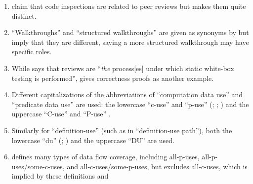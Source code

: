 \begin{enumerate}
    \item %
          \citetISTQB{} claim that code inspections are related to peer reviews
          but \citet[pp.~94\==95]{Patton2006} makes them quite distinct.
    \item %
          ``Walkthroughs'' and ``structured walkthroughs'' are given
          as synonyms by \citetISTQB{} but \citet[p.~484]{PetersAndPedrycz2000}
          imply that they are different, saying a
          more structured walkthrough may have specific roles.
    \item %
          While \citet[p.~92\ifnotpaper, emphasis added\fi]{Patton2006}
          says that reviews are ``\emph{the} process[es] under which static
          white-box testing is performed'', \citet[pp.~418\==419]{vanVliet2000}
          gives correctness proofs as another example.
    \item %
          Different capitalizations of the abbreviations of ``computation data
          use'' and ``predicate data use'' are used: the lowercase ``\acs{c-use}''
          and ``\acs{p-use}'' (\citealp[pp.~3, 27\==29, 35\==36, 114\==155,
              117\==118, 129]{IEEE2021c}; \citeyear[p.~124]{IEEE2017};
          \citealp[p.~477, Tab.~12.6]{PetersAndPedrycz2000}) and the uppercase
          ``C-use'' and ``P-use'' \citep[pp.~424\==425]{vanVliet2000}.
    \item %
          Similarly for ``definition-use'' (such as in ``definition-use
          path''), both the lowercase ``du'' (\citealp[pp.~3, 27, 29, 35,
              119\==121, 129]{IEEE2021c}; \citealp[pp.~478\==479]{
              PetersAndPedrycz2000}) and the uppercase ``DU''
          \citep[p.~425]{vanVliet2000} are used.
    \item %
           defines many types of data
          flow coverage, including all-\acsp{p-use},
          all-\acsp{p-use}/some-\acsp{c-use}, and
          all-\acsp{c-use}/some-\acsp{p-use}, but
          excludes all-\acsp{c-use}, which is implied by these definitions and

\end{enumerate}
